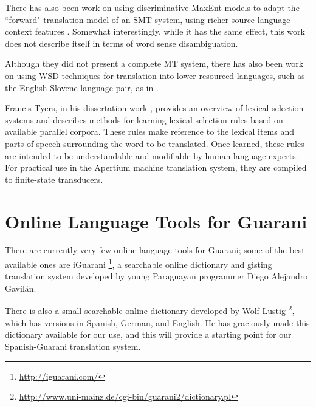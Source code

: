 There has also been work on using discriminative MaxEnt models to adapt
the ``forward" translation model of an SMT system, using richer
source-language context features \cite{vzabokrtsky-popel-marevcek:2010:WMT}.
Somewhat interestingly, while it has the same effect, this work does not
describe itself in terms of word sense disambiguation.

Although they did not present a complete MT system, there has also been work
on using WSD techniques for translation into lower-resourced languages, such as
the English-Slovene language pair, as in
\cite{vintar-fivser-vrvsvcaj:2012:ESIRMT-HyTra2012}. 


Francis Tyers, in his dissertation work \cite{tyers-dissertation},
provides an overview of lexical selection systems and describes methods for
learning lexical selection rules based on available parallel corpora.
These rules make reference to the lexical items and parts of speech surrounding
the word to be translated. Once learned, these rules are intended to be
understandable and modifiable by human language experts. For practical use in
the Apertium machine translation system, they are compiled to finite-state
transducers.


\section{Online Language Tools for Guarani}
There are currently very few online language tools for Guarani; some of the
best available ones are iGuarani \footnote{\url{http://iguarani.com/}}, a
searchable online dictionary and gisting translation system developed by young
Paraguayan programmer Diego Alejandro Gavilán.

There is also a small searchable online dictionary developed by Wolf Lustig
\footnote{\url{http://www.uni-mainz.de/cgi-bin/guarani2/dictionary.pl}},
which has versions in Spanish, German, and English. He has graciously made this
dictionary available for our use, and this will provide a starting point for
our Spanish-Guarani translation system.


